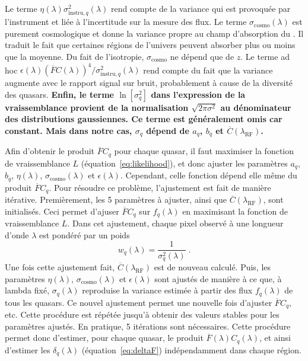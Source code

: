 \documentclass[11pt, twoside, a4paper, openright]{report}
\begin{document}
Le terme $\eta(\lambda)\sigma_{\mathrm{instru}, q}^2(\lambda)$ rend compte de la variance qui est provoquée par l'instrument et liée à l'incertitude sur la mesure des flux. Le terme $\sigma_{\mathrm{cosmo}}(\lambda)$ est purement cosmologique et donne la variance propre au champ d'absorption du \lya{}. Il traduit le fait que certaines régions de l'univers peuvent absorber plus ou moins que la moyenne. Du fait de l'isotropie, $\sigma_{\mathrm{cosmo}}$ ne dépend que de $z$. Le terme ad hoc $\epsilon(\lambda)(\overline F C(\lambda))^4 / \sigma_{\mathrm{instru},q}^2 (\lambda)$ rend compte du fait que la variance augmente avec le rapport signal sur bruit, probablement à cause de la diversité des quasars.
\textbf{Enfin, le terme $\ln [\sigma_q^2]$ dans l'expression de la vraissemblance provient de la normalisation $\sqrt{2 \pi \sigma^2}$ au dénominateur des distributions gaussiennes. Ce terme est généralement omis car constant. Mais dans notre cas, $\sigma_q$ dépend de $a_q$, $b_q$ et $\overline C(\lambda_{\mathrm{RF}})$.
}

Afin d'obtenir le produit $\overline F C_q$ pour chaque quasar, il faut maximiser la fonction de vraissemblance $L$ (équation~\ref{eq:likelihood}), et donc ajuster les paramètres $a_q$, $b_q$, $\eta(\lambda)$, $\sigma_{\mathrm{cosmo}}(\lambda)$ et $\epsilon(\lambda)$. Cependant, celle fonction dépend elle même du produit $\overline F C_q$. Pour résoudre ce problème, l'ajustement est fait de manière itérative.
Premièrement, les 5 paramètres à ajuster, ainsi que $\overline C(\lambda_{\mathrm{RF}})$, sont initialisés. Ceci permet d'ajuser $\overline F C_q$ sur $f_q(\lambda)$ en maximisant la fonction de vraissemblance $L$. Dans cet ajustement, chaque pixel observé à une longueur d'onde $\lambda$ est pondéré par un poids
\begin{equation}
  \label{eq:weights}
  w_{q}(\lambda) = \frac{1}{\sigma_{q}^2(\lambda)}  \; .
\end{equation}
Une fois cette ajustement fait, $\overline C(\lambda_{\mathrm{RF}})$ est de nouveau calculé. Puis, les paramètres $\eta(\lambda)$, $\sigma_{\mathrm{cosmo}}(\lambda)$ et $\epsilon(\lambda)$ sont ajustés de manière à ce que, à lambda fixé, $\sigma_q(\lambda)$ reproduise la variance estimée à partir des flux $f_q(\lambda)$ de tous les quasars. Ce nouvel ajustement permet une nouvelle fois d'ajuster $\overline F C_q$, etc. Cette procédure est répétée jusqu'à obtenir des valeurs stables pour les paramètres ajustés. En pratique, 5 itérations sont nécessaires.
Cette procédure permet donc d'estimer, pour chaque quasar, le produit $\overline F(\lambda) C_q(\lambda)$, et ainsi d'estimer les $\delta_q(\lambda)$ (équation~\ref{eq:deltaF}) indépendamment dans chaque région.
\end{document}
